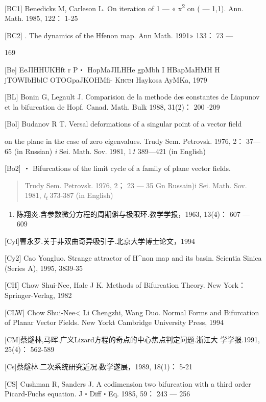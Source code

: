 {[}BC1{]} Benedicks M, Carleson L. On iteration of 1 --- «
x\textsuperscript{2} on ( --- 1,1). Ann. Math. 1985, 122： 1-25

{[}BC2{]} . The dynamics of the Hfenon map. Ann Math. 1991» 133： 73 ---

169

{[}Be{]} EeJIHHUKHft r P・ HopMaJILHHe gpMbh I HBapMaHMH H jTOWIbHblC
OTOGpaJKOHMfi- \textsc{Khcbi} Haykosa AyMKa, 1979

{[}BL{]} Bonin G, Legault J. Comparision de la methode des eonstantes de
Lia­punov et la bifurcation de Hopf. Canad. Math. Bulk 1988, 31(2)： 200
-209

{[}Bol{]} Budanov R T. Versal deformations of a singular point of a
vector field

on the plane in the case of zero eigenvalues. Trudy Sem. Petrovsk. 1976,
2： 37---65 (in Russian) \emph{i} Sei. Math. Sov. 1981, 1\emph{1}
389---421 (in English)

{[}Bo2{]} ・ Bifurcations of the limit cycle of a family of plane vector
fields.

\begin{quote}
Trudy Sem. Petrovsk. 1976, 2； 23 --- 35 Gn Russain)i Sei. Math. Sov.
1981, \emph{l\textsubscript{t}} 373-387 (in English)
\end{quote}

\begin{enumerate}
\def\labelenumi{\Roman{enumi}.}
\setcounter{enumi}{99}
\item
  陈翔炎.含参数微分方程的周期僻与极限环.教学学报，1963, 13(4)： 607 ---
  609
\end{enumerate}

{[}Cyl{]}曹永罗.关于非双曲奇异吸引子.北京大学博士论文，1994

{[}Cy2{]} Cao Yongluo. Strange attractor of H\^{}non map and its basin.
Scientia Sinica (Series A), 1995, 3839-35

{[}CH{]} Chow Shui-Nee, Hale J K. Methods of Bifurcation Theory. New
York： Springer-Verlag, 1982

{[}CLW{]} Chow Shui-Nee\textless{} Li Chengzhi, Wang Duo. Normal Forms
and Bifur­cation of Planar Vector Fields. New Yorkt Cambridge University
Press, 1994

{[}CM{]}蔡燧林,马晖.广义Lizard方程的奇点的中心焦点判定问题.浙江大
学学报.1991, 25(4)： 562-589

{[}Cs{]}蔡燧林.二次系统研究近况.数学遂展，1989, 18(1)： 5-21

{[}CS{]} Cushman R, Sanders J. A codimension two bifurcation with a
third or­der Picard-Fuchs equation. J・Diff・Eq. 1985, 59： 243 --- 256

